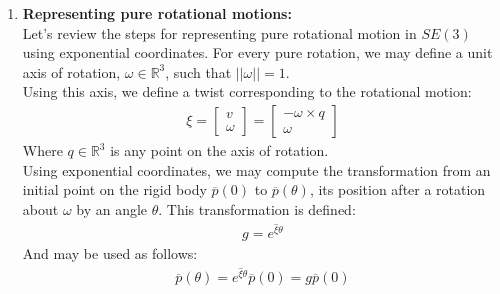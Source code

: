 \documentclass[oneside]{book}
\begin{document}
\begin{enumerate}
    \item \textbf{Representing pure rotational motions:}\\
    Let's review the steps for representing pure rotational motion in $SE(3)$ using exponential coordinates. For every pure rotation, we may define a unit axis of rotation, $\omega \in \mathbb{R}^3$, such that $||\omega|| = 1$.\\
    Using this axis, we define a twist corresponding to the rotational motion:
    \begin{align}
        \xi = 
        \begin{bmatrix}
            v\\
            \omega
        \end{bmatrix}
        = 
        \begin{bmatrix}
            -\omega \times q\\
            \omega
        \end{bmatrix}
    \end{align}
    Where $q\in \mathbb{R}^3$ is any point on the axis of rotation.\\
    Using exponential coordinates, we may compute the transformation from an initial point on the rigid body $\overline{p}(0)$ to $\overline{p}(\theta)$, its position after a rotation about $\omega$ by an angle $\theta$. This transformation is defined:
    \begin{align}
        g = e^{\hat\xi \theta}
    \end{align}
    And may be used as follows:
    \begin{align}
        \overline{p}(\theta) =  e^{\hat\xi \theta} \overline{p}(0) = g \overline{p}(0)
    \end{align}
    

\end{enumerate}
\end{document}
